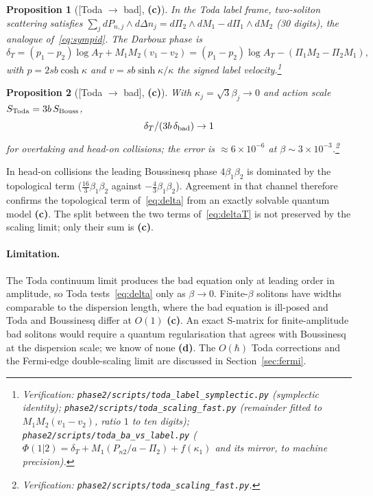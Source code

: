 \documentclass[11pt,a4paper]{article}
\newcommand{\lab}[1]{{\normalfont\sffamily\footnotesize\bfseries(#1)}}
\newcommand{\Lc}{\lab{c}}
\newcommand{\Ld}{\lab{d}}
\newcommand{\eqtag}[2]{{\normalfont\sffamily\footnotesize\textcolor{#1}{[#2]}}}
\newcommand{\scr}[1]{\nolinkurl{#1}}
\newcommand{\chk}[1]{\footnote{\raggedright Verification: #1.}}
\newcommand{\hb}{\hbar}
\newtheorem{proposition}{Proposition}[section]
\theoremstyle{remark}
\begin{document}
\begin{proposition}[\eqtag{red!60!black}{Toda $\to$ bad}, \Lc]\label{prop:todalabel}
In the Toda label frame, two-soliton scattering satisfies $\sum_jdP_{n,j}\wedge d\Delta n_j=d\Pi_2\wedge dM_1-d\Pi_1\wedge dM_2$ (30 digits), the analogue of~\eqref{eq:sympid}. The Darboux phase is
\begin{equation}\label{eq:deltaT}
\delta_T=(p_1-p_2)\log A_T+M_1M_2(v_1-v_2)=(p_1-p_2)\log A_T-(\Pi_1M_2-\Pi_2M_1),
\end{equation}
with $p=2sb\cosh\kappa$ and $v=sb\sinh\kappa/\kappa$ the signed label velocity.\chk{\scr{phase2/scripts/toda_label_symplectic.py} (symplectic identity); \scr{phase2/scripts/toda_scaling_fast.py} (remainder fitted to $M_1M_2(v_1-v_2)$, ratio $1$ to ten digits); \scr{phase2/scripts/toda_ba_vs_label.py} ($\Phi(1|2)=\delta_T+M_1(P_{n2}/a-\Pi_2)+f(\kappa_1)$ and its mirror, to machine precision)}
\end{proposition}

\begin{proposition}[\eqtag{red!60!black}{Toda $\to$ bad}, \Lc]\label{prop:todascaling}
With $\kappa_j=\sqrt3\beta_j\to0$ and action scale $S_{\rm Toda}=3b\,S_{\rm Bouss}$,
\[
\delta_T/(3b\,\delta_{\rm bad})\to1
\]
for overtaking \emph{and} head-on collisions; the error is $\approx6\times10^{-6}$ at $\beta\sim3\times10^{-3}$.\chk{\scr{phase2/scripts/toda_scaling_fast.py}}
\end{proposition}

In head-on collisions the leading Boussinesq phase $4\beta_1\beta_2$ is dominated by the topological term ($\tfrac{16}3\beta_1\beta_2$ against $-\tfrac43\beta_1\beta_2$). Agreement in that channel therefore confirms the topological term of~\eqref{eq:delta} from an exactly solvable quantum model \Lc. The split between the two terms of~\eqref{eq:deltaT} is not preserved by the scaling limit; only their sum is \Lc.

\paragraph{Limitation.} The Toda continuum limit produces the bad equation only at leading order in amplitude, so Toda tests~\eqref{eq:delta} only as $\beta\to0$. Finite-$\beta$ solitons have widths comparable to the dispersion length, where the bad equation is ill-posed and Toda and Boussinesq differ at $O(1)$ \Lc. An exact S-matrix for finite-amplitude bad solitons would require a quantum regularisation that agrees with Boussinesq at the dispersion scale; we know of none \Ld. The $O(\hb)$ Toda corrections and the Fermi-edge double-scaling limit are discussed in Section~\ref{sec:fermi}.
\end{document}
